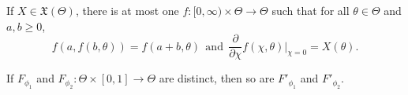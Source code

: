\begin{fact}
	If $X \in \mathfrak X(\Theta)$, 
	there is at most one
	$f : [0,\infty) \times \Theta \to \Theta$
	such that for all $\theta \in \Theta$ and $a,b\ge 0$,
	\[
	f(a, f(b, \theta)) = f(a+b,\theta)
		~~\text{and}~~
	\frac{\partial}{\partial \chi}
	 	f(\chi,\theta)
		\Big|_{\chi{=}0}
		\!\!= X(\theta)
		.
	\]
	\label{fact:unique-integral-curves}
\end{fact}
\begin{coro}
	If $F_{\phi_1}$ and $F_{\phi_2}: \Theta \times[0,1] \to \Theta$ are distinct,
	then so are $F'_{\phi_1}$ and $F'_{\phi_2}
	$.
	\label{fact:unique-flow-for-vfield}
\end{coro}

